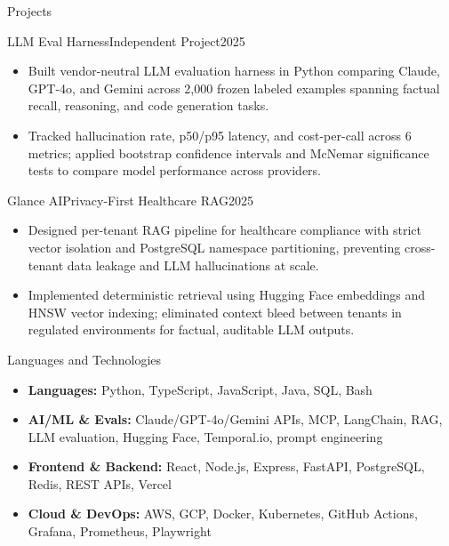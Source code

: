 \documentclass[]{mcdowellcv}
\begin{document}
\begin{cvsection}{Projects}
  \begin{cvsubsection}{LLM Eval Harness}{Independent Project}{2025}
    \begin{itemize}
      \item Built vendor-neutral LLM evaluation harness in Python comparing Claude, GPT-4o, and Gemini across 2,000 frozen labeled examples spanning factual recall, reasoning, and code generation tasks.
      \item Tracked hallucination rate, p50/p95 latency, and cost-per-call across 6 metrics; applied bootstrap confidence intervals and McNemar significance tests to compare model performance across providers.
    \end{itemize}
    \vspace{-1.5pt}
  \end{cvsubsection}

  \begin{cvsubsection}{Glance AI}{Privacy-First Healthcare RAG}{2025}
    \begin{itemize}
      \item Designed per-tenant RAG pipeline for healthcare compliance with strict vector isolation and PostgreSQL namespace partitioning, preventing cross-tenant data leakage and LLM hallucinations at scale.
      \item Implemented deterministic retrieval using Hugging Face embeddings and HNSW vector indexing; eliminated context bleed between tenants in regulated environments for factual, auditable LLM outputs.
    \end{itemize}
  \end{cvsubsection}
\end{cvsection}

\begin{cvsection}{Languages and Technologies}
  \begin{cvsubsection}{}{}{}
    \begin{itemize}
      \item \textbf{Languages:} Python, TypeScript, JavaScript, Java, SQL, Bash
      \item \textbf{AI/ML \& Evals:} Claude/GPT-4o/Gemini APIs, MCP, LangChain, RAG, LLM evaluation, Hugging Face, Temporal.io, prompt engineering
      \item \textbf{Frontend \& Backend:} React, Node.js, Express, FastAPI, PostgreSQL, Redis, REST APIs, Vercel
      \item \textbf{Cloud \& DevOps:} AWS, GCP, Docker, Kubernetes, GitHub Actions, Grafana, Prometheus, Playwright
    \end{itemize}
  \end{cvsubsection}
\end{cvsection}
\end{document}
